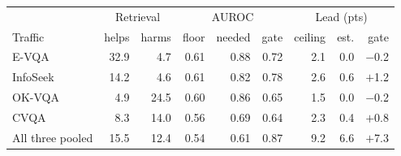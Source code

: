 \begin{tabular}{@{}lrrrrrrrr@{}}
\toprule
 & \multicolumn{2}{c}{Retrieval} & \multicolumn{3}{c}{AUROC} & \multicolumn{3}{c}{Lead (pts)} \\
Traffic & helps & harms & floor & needed & gate & ceiling & est. & gate \\
\midrule
E-VQA & 32.9 & 4.7 & 0.61 & 0.88 & 0.72 & 2.1 & 0.0 & $-$0.2 \\
InfoSeek & 14.2 & 4.6 & 0.61 & 0.82 & 0.78 & 2.6 & 0.6 & $+$1.2 \\
OK-VQA & 4.9 & 24.5 & 0.60 & 0.86 & 0.65 & 1.5 & 0.0 & $-$0.2 \\
CVQA & 8.3 & 14.0 & 0.56 & 0.69 & 0.64 & 2.3 & 0.4 & $+$0.8 \\
\midrule
All three pooled & 15.5 & 12.4 & 0.54 & 0.61 & 0.87 & 9.2 & 6.6 & $+$7.3 \\
\bottomrule
\end{tabular}
